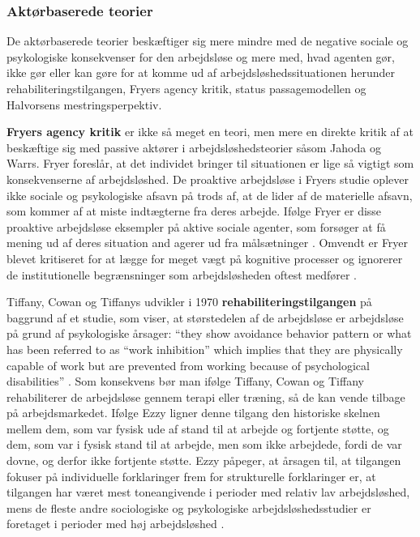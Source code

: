\subsubsection{Aktørbaserede teorier}

De aktørbaserede teorier beskæftiger sig mere mindre med de negative sociale og psykologiske konsekvenser for den arbejdsløse og mere med, hvad agenten gør, ikke gør eller kan gøre for at komme ud af arbejdsløshedssituationen herunder rehabiliteringstilgangen, Fryers agency kritik, status passagemodellen og Halvorsens mestringsperpektiv.

\textbf{Fryers agency kritik} er ikke så meget en teori, men mere en direkte kritik af at beskæftige sig med passive aktører i arbejdsløshedsteorier såsom Jahoda og Warrs. Fryer foreslår, at det individet bringer til situationen er lige så vigtigt som konsekvenserne af arbejdsløshed. De proaktive arbejdsløse i Fryers studie oplever ikke sociale og psykologiske afsavn på trods af, at de lider af de materielle afsavn, som kommer af at miste indtægterne fra deres arbejde. Ifølge Fryer er disse proaktive arbejdsløse eksempler på aktive sociale agenter, som forsøger at få mening ud af deres situation and agerer ud fra målsætninger \parencite[47]{Ezzy1993}. Omvendt er Fryer blevet kritiseret for at lægge for meget vægt på kognitive processer og ignorerer de institutionelle begrænsninger som arbejdsløsheden oftest medfører \parencite[47]{Ezzy1993}.

Tiffany, Cowan og Tiffanys udvikler i 1970 \textbf{rehabiliteringstilgangen} på baggrund af et studie, som viser, at størstedelen af de arbejdsløse er arbejdsløse på grund af psykologiske årsager: “they show avoidance behavior pattern or what has been referred to as “work inhibition” which implies that they are physically capable of work but are prevented from working because of psychological disabilities” \parencite[43]{Ezzy1993}. Som konsekvens bør man ifølge Tiffany, Cowan og Tiffany rehabiliterer de arbejdsløse gennem terapi eller træning, så de kan vende tilbage på arbejdsmarkedet. Ifølge Ezzy ligner denne tilgang den historiske skelnen mellem dem, som var fysisk ude af stand til at arbejde og fortjente støtte, og dem, som var i fysisk stand til at arbejde, men som ikke arbejdede, fordi de var dovne, og derfor ikke fortjente støtte. Ezzy påpeger, at årsagen til, at tilgangen fokuser på individuelle forklaringer frem for strukturelle forklaringer er, at tilgangen har været mest toneangivende i perioder med relativ lav arbejdsløshed, mens de fleste andre sociologiske og psykologiske arbejdsløshedsstudier er foretaget i perioder med høj arbejdsløshed \parencite[43]{Ezzy1993}.
 
